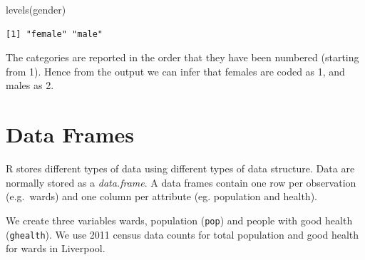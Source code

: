 \documentclass[
  letterpaper,
  DIV=11,
  numbers=noendperiod,
  oneside]{scrreprt}
\newenvironment{Shaded}{\begin{snugshade}}{\end{snugshade}}
\newcommand{\FunctionTok}[1]{\textcolor[rgb]{0.28,0.35,0.67}{#1}}
\newcommand{\NormalTok}[1]{\textcolor[rgb]{0.00,0.23,0.31}{#1}}
\begin{document}
\begin{Shaded}
\begin{Highlighting}[]
\FunctionTok{levels}\NormalTok{(gender)}
\end{Highlighting}
\end{Shaded}

\begin{verbatim}
[1] "female" "male"  
\end{verbatim}

The categories are reported in the order that they have been numbered
(starting from 1). Hence from the output we can infer that females are
coded as 1, and males as 2.

\section{Data Frames}\label{data-frames}

R stores different types of data using different types of data
structure. Data are normally stored as a \emph{data.frame}. A data
frames contain one row per observation (e.g.~wards) and one column per
attribute (eg. population and health).

We create three variables wards, population (\texttt{pop}) and people
with good health (\texttt{ghealth}). We use 2011 census data counts for
total population and good health for wards in Liverpool.
\end{document}
